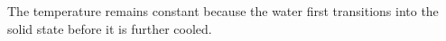 The temperature remains constant because the water first transitions into the solid state before it is further cooled.